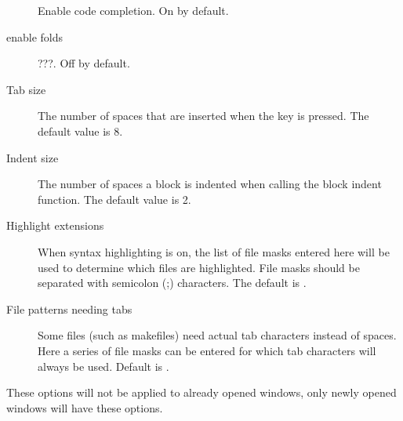 \begin{description}
Enable code completion. On by default.
\item[enable folds]
???. Off by default.
\item[Tab size]
The number of spaces that are inserted when the  key is pressed.
The default value is 8.
\item[Indent size]
The number of spaces a block is indented when calling the block indent function.
The default value is 2.
\item[Highlight extensions]
When syntax highlighting is on, the list of file masks entered here will be
used to determine which files are highlighted. File masks should be
separated with semicolon (;) characters. The default is
.
\item[File patterns needing tabs]
Some files (such as makefiles) need actual tab characters instead of spaces. 
Here a series of file masks can be entered for which tab characters will
always be used. Default is .
\end{description}
\begin{remark}
These options will not be applied to already opened windows, only newly
opened windows will have these options.
\end{remark}
%
%
